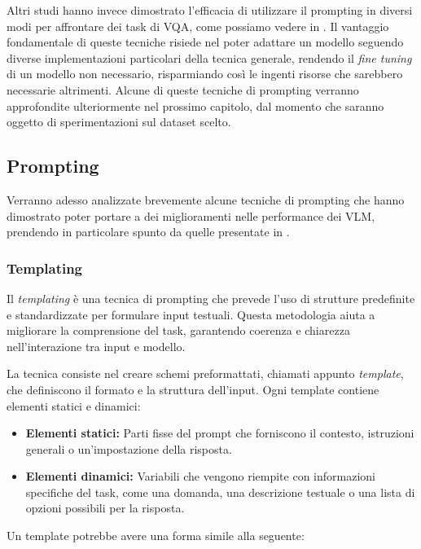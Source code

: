 \documentclass[../main.tex]{subfiles}
\begin{document}
Altri studi hanno invece dimostrato l'efficacia di utilizzare il prompting in diversi modi per affrontare dei task di VQA, come possiamo vedere in \cite{awal2024investigatingpromptingtechniqueszero}. 
Il vantaggio fondamentale di queste tecniche risiede nel poter adattare un modello seguendo diverse implementazioni particolari della tecnica generale, rendendo il \textit{fine tuning} di un modello non necessario, risparmiando così le ingenti risorse che sarebbero necessarie altrimenti.
Alcune di queste tecniche di prompting verranno approfondite ulteriormente nel prossimo capitolo, dal momento che saranno oggetto di sperimentazioni sul dataset scelto. 

\subsection{Prompting}

Verranno adesso analizzate brevemente alcune tecniche di prompting che hanno dimostrato poter portare a dei miglioramenti nelle performance dei VLM, prendendo in particolare spunto da quelle presentate in \cite{awal2024investigatingpromptingtechniqueszero}.

\subsubsection{Templating}

Il \textit{templating} è una tecnica di prompting che prevede l'uso di strutture predefinite e standardizzate per formulare input testuali. Questa metodologia aiuta a migliorare la comprensione del task, garantendo coerenza e chiarezza nell'interazione tra input e modello.

La tecnica consiste nel creare schemi preformattati, chiamati appunto \textit{template}, che definiscono il formato e la struttura dell'input. Ogni template contiene elementi statici e dinamici:
\begin{itemize}
    \item \textbf{Elementi statici:} Parti fisse del prompt che forniscono il contesto, istruzioni generali o un'impostazione della risposta.
    \item \textbf{Elementi dinamici:} Variabili che vengono riempite con informazioni specifiche del task, come una domanda, una descrizione testuale o una lista di opzioni possibili per la risposta.
\end{itemize}

Un template potrebbe avere una forma simile alla seguente: 
\end{document}
